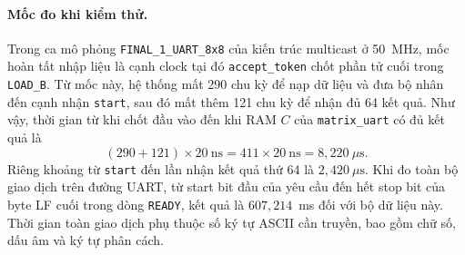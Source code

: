 \paragraph{Mốc đo khi kiểm thử.}
Trong ca mô phỏng \texttt{FINAL\_1\_UART\_8x8} của kiến trúc
multicast ở 50~MHz, mốc hoàn tất nhập liệu là cạnh clock tại đó
\texttt{accept\_token} chốt phần tử cuối trong \texttt{LOAD\_B}.
Từ mốc này, hệ thống mất 290 chu kỳ để nạp dữ liệu và đưa bộ nhân
đến cạnh nhận \texttt{start}, sau đó mất thêm 121 chu kỳ để nhận đủ
64 kết quả. Như vậy, thời gian từ khi chốt đầu vào đến khi RAM $C$
của \texttt{matrix\_uart} có đủ kết quả là
\[
    (290+121)\times20~\mathrm{ns}
    = 411\times20~\mathrm{ns}
    = 8{,}220~\mu\mathrm{s}.
\]
Riêng khoảng từ \texttt{start} đến lần nhận kết quả thứ 64 là
$2{,}420~\mu\mathrm{s}$. Khi đo toàn bộ giao dịch trên đường UART,
từ start bit đầu của yêu cầu đến hết stop bit của byte LF cuối
trong dòng \texttt{READY}, kết quả là $607{,}214$~ms đối với bộ
dữ liệu này. Thời gian toàn giao dịch phụ thuộc số ký tự ASCII
cần truyền, bao gồm chữ số, dấu âm và ký tự phân cách.